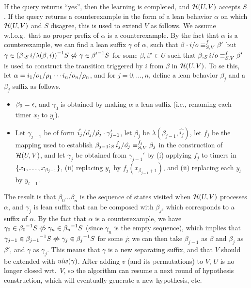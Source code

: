 If the query returns ``yes'', then
the learning is completed, and $\mathcal{H}(U,V)$ accepts $S$.
If the query returns a counterexample in the form of a lean behavior
$\alpha$ on which $\mathcal{H}(U,V)$ and $S$ disagree,
this is used to extend $V$ as follows.
We assume w.l.o.g.\ that no proper prefix of $\alpha$ is a counterexample. 
By the fact that $\alpha$ is a counterexample, we can find a lean
suffix $\gamma$ of $\alpha$, such that
$\beta\cdot i/o \equiv_{S,V}^f \beta'$ but
$\gamma \in \suffixbehs{S}{(\extend{\beta}{i}{\lambda(\beta,i)})}
\smallnotiff \gamma \in \suffixbehs{S}{\beta'}$
for some $\beta,\beta' \in U$ such that 
$\beta;_{S}i/o \equiv_{S,V}^f \beta'$ is used to construct
the transition triggered by $i$ from $\beta$ in $\mathcal{H}(U,V)$.
To se this, let $\alpha = i_1/o_1/\rho_1 \cdots i_n/o_n/\rho_n$, and for $j = 0 , \ldots, n$, define
a lean behavior $\beta_j$ and a $\beta_j$-suffix as follows.
\begin{itemize}
\item $\beta_0 = \epsilon$, and
  $\gamma_0$ is obtained by making $\alpha$ a lean suffix (i.e.,
  renaming each timer $x_l$ to $y_l$).
\item
  Let $\gamma_{j-1}$ be of form
  $\hat{i_j}/\hat{o_j}/\hat{\rho_j} \cdot \gamma_{j-1}'$,
  let $\beta_j$ be $\lambda(\beta_{j-1},\hat{i_j})$,
  let $f_j$ be the mapping used to establish
  $\beta_{j-1};_{S}\hat{i_j}/\hat{o_j} \equiv_{S,V}^{f_j} \beta_{j}$
  in the construction of $\mathcal{H}(U,V)$,
  and let $\gamma_j$ be obtained from $\gamma_{j-1}'$ by
  (i) applying $f_j$ to timers in $\lbrace x_1, \ldots , x_{\beta_{j-1}}\rbrace$,
  (ii) replacing $y_1$ by $f_j(x_{\beta_{j-1}+1})$, and
  (ii) replacing each $y_l$ by $y_{l-1}$.
\end{itemize}
The result is that
$\beta_0 \ldots \beta_n$ is the sequence of states 
visited when $\mathcal{H}(U,V)$ processes $\alpha$, and
$\gamma_j$ is lean suffix that can be composed with $\beta_j$,
which corresponds to a suffix of $\alpha$.
By the fact that $\alpha$ is a counterexample, we have
$\gamma_0 \in\suffixbehs{S}{\beta_0} \smallnotiff \gamma_n \in\suffixbehs{S}{\beta_n}$ (since $\gamma_n$ is the empty sequence), which implies that
$\gamma_{j-1} \in\suffixbehs{S}{\beta_{j-1}}
\smallnotiff
\gamma_{j} \in\suffixbehs{S}{\beta_{j}}$
for some $j$;
we can then take $\beta_{j-1}$ as $\beta$ and $\beta_j$ as $\beta'$, and
$\gamma$ as $\gamma_j$.
This means that $\gamma$ is a new separating suffix, and that $V$ should be
extended with $\mathit{uiw}(\gamma)$.
After adding $v$ (and its permutations) to $V$, $U$ is no longer closed
wrt.\ $V$, so the algorithm can resume a next round of
hypothesis construction, which will eventually generate a new hypothesis, etc.

